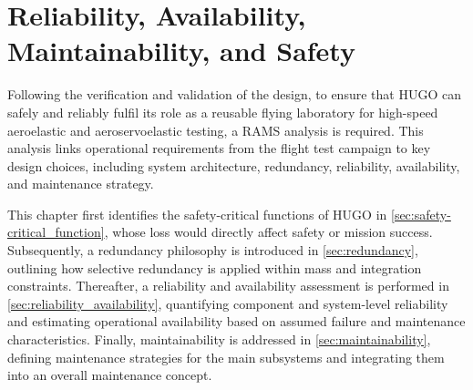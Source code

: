 \chapter{Reliability, Availability, Maintainability, and Safety}
\label{ch:rams}




Following the verification and validation of the design, to ensure that HUGO can safely and reliably fulfil its role as a reusable flying laboratory for high-speed aeroelastic and aeroservoelastic testing, a RAMS analysis is required. This analysis links operational requirements from the flight test campaign to key design choices, including system architecture, redundancy, reliability, availability, and maintenance strategy.

This chapter first identifies the safety-critical functions of HUGO in \autoref{sec:safety-critical_function}, whose loss would directly affect safety or mission success. Subsequently, a redundancy philosophy is introduced in \autoref{sec:redundancy}, outlining how selective redundancy is applied within mass and integration constraints. Thereafter, a reliability and availability assessment is performed in \autoref{sec:reliability_availability}, quantifying component and system-level reliability and estimating operational availability based on assumed failure and maintenance characteristics. Finally, maintainability is addressed in \autoref{sec:maintainability}, defining maintenance strategies for the main subsystems and integrating them into an overall maintenance concept.

